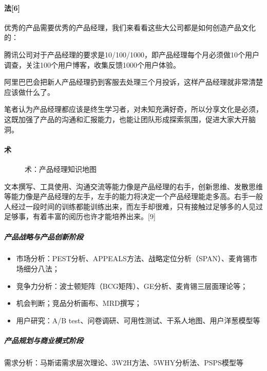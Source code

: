 \documentclass[letterpaper,11pt,english]{sphinxmanual}
\begin{document}
\paragraph{法{[}6{]}}
\label{\detokenize{chapter_introduction/ability:id5}}
优秀的产品需要优秀的产品经理，我们来看看这些大公司都是如何创造产品文化的：

腾讯公司对于产品经理的要求是10/100/1000，即产品经理每个月必须做10个用户调查，关注100个用户博客，收集反馈1000个用户体验。

阿里巴巴会把新人产品经理扔到客服去处理三个月投诉，这样产品经理就非常清楚应该做什么了。

笔者认为产品经理都应该是终生学习者，对未知充满好奇，所以分享文化是必须，这既加强了产品的沟通和汇报能力，也能让团队形成探索氛围，促进大家大开脑洞。


\paragraph{术}
\label{\detokenize{chapter_introduction/ability:id6}}
\begin{figure}[H]
\centering
\capstart

\noindent{}
\caption{术：产品经理知识地图}\label{\detokenize{chapter_introduction/ability:id16}}\end{figure}

文本撰写、工具使用、沟通交流等能力像是产品经理的右手，创新思维、发散思维等能力像是产品经理的左手，左手的能力将决定一个产品经理能走多高。右手一般人经过一段时间的训练都能训练出来，而左手却很难，只有接触过足够多的人见过足够事，有着丰富的阅历也许才能培养出来。{[}9{]}


\subparagraph{产品战略与产品创新阶段}
\label{\detokenize{chapter_introduction/ability:id7}}\begin{itemize}
\item {} 
市场分析：PEST分析、APPEALS方法、战略定位分析（SPAN）、麦肯锡市场细分八法；

\item {} 
竞争力分析：波士顿矩阵（BCG矩阵）、GE分析、麦肯锡三层面理论等；

\item {} 
机会判断；竞品分析画布、MRD撰写；

\item {} 
用户研究：A/B test、问卷调研、可用性测试、干系人地图、用户洋葱模型等

\end{itemize}


\subparagraph{产品规划与商业模式阶段}
\label{\detokenize{chapter_introduction/ability:id8}}
需求分析：马斯诺需求层次理论、3W2H方法、5WHY分析法、PSPS模型等
\end{document}
